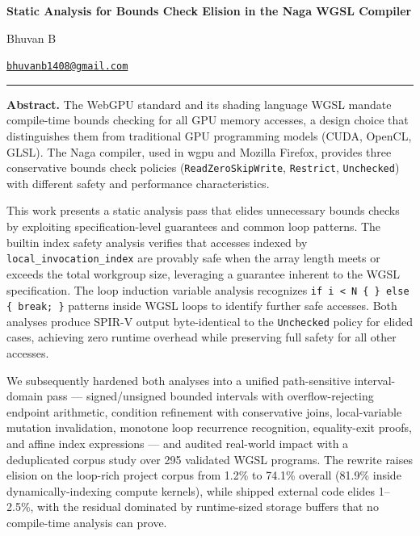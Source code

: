 \documentclass[11pt,a4paper]{article}
\begin{document}
\begin{center}
  {\LARGE\bfseries Static Analysis for Bounds Check Elision in the Naga WGSL Compiler\par}
\end{center}
\vspace{4pt}
{\large Bhuvan B\par}
{\normalsize\href{mailto:bhuvanb1408@gmail.com}{\texttt{bhuvanb1408@gmail.com}}\par}
\vspace{8pt}
\hrule
\vspace{8pt}
\noindent\textbf{Abstract.}
The WebGPU standard and its shading language WGSL mandate compile-time bounds
checking for all GPU memory accesses, a design choice that distinguishes them
from traditional GPU programming models (CUDA, OpenCL, GLSL). The Naga
compiler, used in wgpu and Mozilla Firefox, provides three conservative
bounds check policies (\texttt{ReadZeroSkipWrite}, \texttt{Restrict},
\texttt{Unchecked}) with different safety and performance characteristics.

This work presents a static analysis pass that elides unnecessary bounds
checks by exploiting specification-level guarantees and common loop patterns.
The builtin index safety analysis verifies that accesses indexed by
\texttt{local\_invocation\_index} are provably safe when the array length
meets or exceeds the total workgroup size, leveraging a guarantee inherent
to the WGSL specification. The loop induction variable analysis recognizes
\texttt{if i < N \{ \} else \{ break; \}} patterns inside WGSL loops to
identify further safe accesses. Both analyses produce SPIR-V output
byte-identical to the \texttt{Unchecked} policy for elided cases, achieving
zero runtime overhead while preserving full safety for all other accesses.

We subsequently hardened both analyses into a unified path-sensitive
interval-domain pass --- signed/unsigned bounded intervals with
overflow-rejecting endpoint arithmetic, condition refinement with
conservative joins, local-variable mutation invalidation, monotone loop
recurrence recognition, equality-exit proofs, and affine index expressions
--- and audited real-world impact with a deduplicated corpus study over 295
validated WGSL programs. The rewrite raises elision on the loop-rich project
corpus from 1.2\% to 74.1\% overall (81.9\% inside dynamically-indexing
compute kernels), while shipped external code elides 1--2.5\%, with the
residual dominated by runtime-sized storage buffers that no compile-time
analysis can prove.
  
\end{document}
